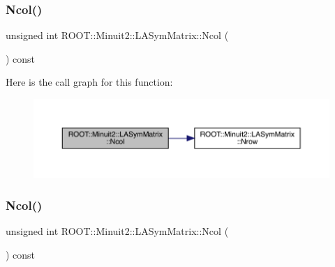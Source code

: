 \subsubsection{\texorpdfstring{Ncol()}{Ncol()}\hspace{0.1cm}{\footnotesize\ttfamily [2/3]}}
{\footnotesize\ttfamily unsigned int R\+O\+O\+T\+::\+Minuit2\+::\+L\+A\+Sym\+Matrix\+::\+Ncol (\begin{DoxyParamCaption}{ }\end{DoxyParamCaption}) const\hspace{0.3cm}{\ttfamily [inline]}}

Here is the call graph for this function\+:
\nopagebreak
\begin{figure}[H]
\begin{center}
\leavevmode
\includegraphics[width=350pt]{d3/d72/classROOT_1_1Minuit2_1_1LASymMatrix_a36bb0f349110a80cb742953ae68fc9c5_cgraph}
\end{center}
\end{figure}
\mbox{\label{classROOT_1_1Minuit2_1_1LASymMatrix_a36bb0f349110a80cb742953ae68fc9c5}} 
\subsubsection{\texorpdfstring{Ncol()}{Ncol()}\hspace{0.1cm}{\footnotesize\ttfamily [3/3]}}
{\footnotesize\ttfamily unsigned int R\+O\+O\+T\+::\+Minuit2\+::\+L\+A\+Sym\+Matrix\+::\+Ncol (\begin{DoxyParamCaption}{ }\end{DoxyParamCaption}) const\hspace{0.3cm}{\ttfamily [inline]}}

